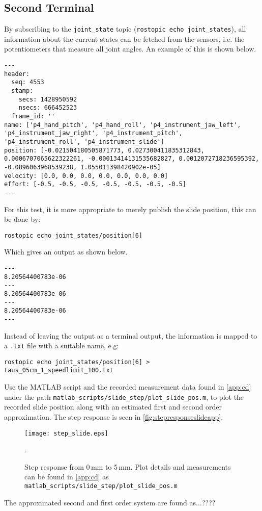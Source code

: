 \subsection*{Second Terminal}
By subscribing to the \texttt{joint\_state} topic (\texttt{rostopic echo joint\_states}), all information about the current states can be fetched from the sensors, i.e. the potentiometers that measure all joint angles. An example of this is shown below.
\begin{lstlisting}[style=DOS]
---
header: 
  seq: 4553
  stamp: 
    secs: 1428950592
    nsecs: 666452523
  frame_id: ''
name: ['p4_hand_pitch', 'p4_hand_roll', 'p4_instrument_jaw_left', 'p4_instrument_jaw_right', 'p4_instrument_pitch', 'p4_instrument_roll', 'p4_instrument_slide']
position: [-0.021504180505871773, 0.027300411835312843, 0.0006707065622322261, -0.00013414131535682827, 0.0012072718236595392, -0.0896063968539238, 1.055011398420902e-05]
velocity: [0.0, 0.0, 0.0, 0.0, 0.0, 0.0, 0.0]
effort: [-0.5, -0.5, -0.5, -0.5, -0.5, -0.5, -0.5]
---
\end{lstlisting}

For this test, it is more appropriate to merely publish the slide position, this can be done by:

\hspace{1cm}\texttt{rostopic echo joint\_states/position[6]}

Which gives an output as shown below.

\begin{lstlisting}[style=DOS]
---
8.20564400783e-06
---
8.20564400783e-06
---
8.20564400783e-06
---
\end{lstlisting}
Instead of leaving the output as a terminal output, the information is mapped to a \texttt{.txt} file with a suitable name, e.g:

\hspace{1cm} \texttt{rostopic echo joint\_states/position[6] > taus\_05cm\_1\_speedlimit\_100.txt}

Use the MATLAB script and the recorded measurement data found in \autoref{app:cd} under the path \texttt{matlab\_scripts/slide\_step/plot\_slide\_pos.m}, to plot the recorded slide position along with an estimated first and second order approximation. The step response is seen in \autoref{fig:stepresponseslideapp}.
\begin{figure}[H]
\center
\texttt{[image: step\_slide.eps]}
\caption{Step response from 0\,mm to 5\,mm. Plot details and measurements can be found in \autoref{app:cd} as \texttt{matlab\_scripts/slide\_step/plot\_slide\_pos.m}}. 
\label{fig:stepresponseslideapp}
\end{figure}
The approximated second and first order system are found as...????